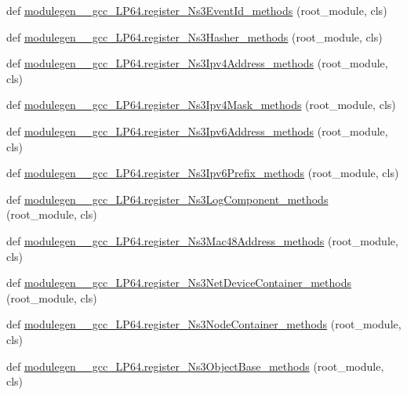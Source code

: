 \begin{DoxyCompactItemize}
\item 
def \hyperlink{namespacemodulegen____gcc__LP64_a11034b778f9a07d9c47a0824be6df6c6}{modulegen\+\_\+\+\_\+gcc\+\_\+\+L\+P64.\+register\+\_\+\+Ns3\+Event\+Id\+\_\+methods} (root\+\_\+module, cls)
\item 
def \hyperlink{namespacemodulegen____gcc__LP64_a6615c86326777b99b9d48f2543fa24fb}{modulegen\+\_\+\+\_\+gcc\+\_\+\+L\+P64.\+register\+\_\+\+Ns3\+Hasher\+\_\+methods} (root\+\_\+module, cls)
\item 
def \hyperlink{namespacemodulegen____gcc__LP64_a52c7eb3519820103a7ff4aaf269a6c89}{modulegen\+\_\+\+\_\+gcc\+\_\+\+L\+P64.\+register\+\_\+\+Ns3\+Ipv4\+Address\+\_\+methods} (root\+\_\+module, cls)
\item 
def \hyperlink{namespacemodulegen____gcc__LP64_abfab99a01a92901ea710a50ce313c67c}{modulegen\+\_\+\+\_\+gcc\+\_\+\+L\+P64.\+register\+\_\+\+Ns3\+Ipv4\+Mask\+\_\+methods} (root\+\_\+module, cls)
\item 
def \hyperlink{namespacemodulegen____gcc__LP64_adadace4a2a2a7b40dbbc479c719515d9}{modulegen\+\_\+\+\_\+gcc\+\_\+\+L\+P64.\+register\+\_\+\+Ns3\+Ipv6\+Address\+\_\+methods} (root\+\_\+module, cls)
\item 
def \hyperlink{namespacemodulegen____gcc__LP64_aabc084fc7c70fffda3389dc15cd95031}{modulegen\+\_\+\+\_\+gcc\+\_\+\+L\+P64.\+register\+\_\+\+Ns3\+Ipv6\+Prefix\+\_\+methods} (root\+\_\+module, cls)
\item 
def \hyperlink{namespacemodulegen____gcc__LP64_a32b8a9e92d01c371bc1a02aaa2ecc28f}{modulegen\+\_\+\+\_\+gcc\+\_\+\+L\+P64.\+register\+\_\+\+Ns3\+Log\+Component\+\_\+methods} (root\+\_\+module, cls)
\item 
def \hyperlink{namespacemodulegen____gcc__LP64_aa406a8e967bb0e5456a51fcef1ec276b}{modulegen\+\_\+\+\_\+gcc\+\_\+\+L\+P64.\+register\+\_\+\+Ns3\+Mac48\+Address\+\_\+methods} (root\+\_\+module, cls)
\item 
def \hyperlink{namespacemodulegen____gcc__LP64_a43937d11569618c76bf10e334e87f976}{modulegen\+\_\+\+\_\+gcc\+\_\+\+L\+P64.\+register\+\_\+\+Ns3\+Net\+Device\+Container\+\_\+methods} (root\+\_\+module, cls)
\item 
def \hyperlink{namespacemodulegen____gcc__LP64_afc1115291cc5820268d802870956928d}{modulegen\+\_\+\+\_\+gcc\+\_\+\+L\+P64.\+register\+\_\+\+Ns3\+Node\+Container\+\_\+methods} (root\+\_\+module, cls)
\item 
def \hyperlink{namespacemodulegen____gcc__LP64_a811b76d9911bfa2ed025b14b9a8aeb50}{modulegen\+\_\+\+\_\+gcc\+\_\+\+L\+P64.\+register\+\_\+\+Ns3\+Object\+Base\+\_\+methods} (root\+\_\+module, cls)

\end{DoxyCompactItemize}

